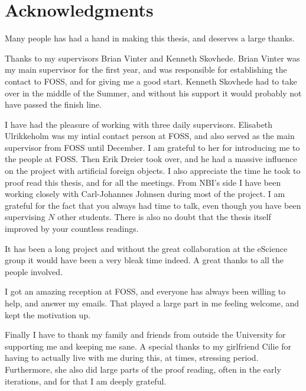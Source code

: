 



\begingroup
\let\clearpage\relax

\section*{Acknowledgments}
Many people has had a hand in making this thesis, and deserves a large thanks.

Thanks to my supervisors Brian Vinter and Kenneth Skovhede.
Brian Vinter was my main supervisor for the first year, and was responsible for establishing the contact to FOSS, and for giving me a good start. Kenneth Skovhede had to take over in the middle of the Summer, and without his support it would probably not have passed the finish line.

I have had the pleasure of working with three daily supervisors.
Elisabeth Ulrikkeholm was my intial contact person at FOSS, and also served as the main supervisor from FOSS until December. I am grateful to her for introducing me to the people at FOSS.
Then Erik Dreier took over, and he had a massive influence on the project with artificial foreign objects.
I also appreciate the time he took to proof read this thesis, and for all the meetings.
From NBI's side I have been working closely with Carl-Johannes Johnsen during most of the project. 
I am grateful for the fact that you always had time to talk, even though you have been supervising $N$ other students. 
There is also no doubt that the thesis itself improved by your countless readings.

It has been a long project and without the great collaboration at the eScience group it would have been a very bleak time indeed.
A great thanks to all the people involved.

I got an amazing reception at FOSS, and everyone has always been willing to help, and answer my emails. That played a large part in me feeling welcome, and kept the motivation up.

Finally I have to thank my family and friends from outside the University for supporting me and keeping me sane.
A special thanks to my girlfriend Cilie for having to actually live with me during this, at times, stressing period. Furthermore, she also did large parts of the proof reading, often in the early iterations, and for that I am deeply grateful.

\endgroup